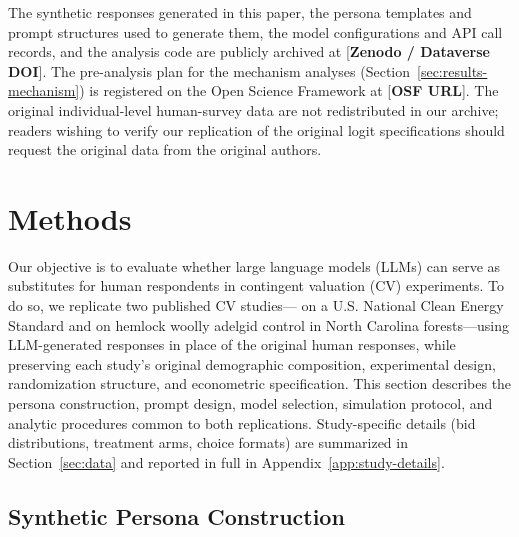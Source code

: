 \documentclass[12pt]{article}
\begin{document}
The synthetic responses generated in this paper, the persona templates and prompt structures used to generate them, the model configurations and API call records, and the analysis code are publicly archived at [\textbf{Zenodo / Dataverse DOI}]. The pre-analysis plan for the mechanism analyses (Section~\ref{sec:results-mechanism}) is registered on the Open Science Framework at [\textbf{OSF URL}]. The original individual-level human-survey data are not redistributed in our archive; readers wishing to verify our replication of the original logit specifications should request the original data from the original authors.


%
%

\section{Methods}\label{sec:methods}

Our objective is to evaluate whether large language models (LLMs) can serve as substitutes for human respondents in contingent valuation (CV) experiments. To do so, we replicate two published CV studies---\textcite{Aldy2012} on a U.S. National Clean Energy Standard and \textcite{Giguere2020} on hemlock woolly adelgid control in North Carolina forests---using LLM-generated responses in place of the original human responses, while preserving each study's original demographic composition, experimental design, randomization structure, and econometric specification. This section describes the persona construction, prompt design, model selection, simulation protocol, and analytic procedures common to both replications. Study-specific details (bid distributions, treatment arms, choice formats) are summarized in Section~\ref{sec:data} and reported in full in Appendix~\ref{app:study-details}.

\subsection{Synthetic Persona Construction}\label{sec:methods-persona}
\end{document}
